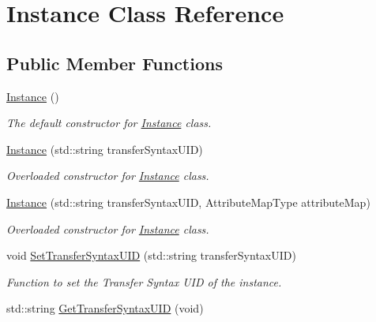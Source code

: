 \hypertarget{class_instance}{
\section{Instance Class Reference}
\label{class_instance}
}
\subsection*{Public Member Functions}
\begin{DoxyCompactItemize}
\item 
\hypertarget{class_instance_a399506c7e75ab9ab78fbc34a25932bbd}{
\hyperlink{class_instance_a399506c7e75ab9ab78fbc34a25932bbd}{Instance} ()}
\label{class_instance_a399506c7e75ab9ab78fbc34a25932bbd}

\begin{DoxyCompactList}\small\item\em The default constructor for \hyperlink{class_instance}{Instance} class. \item\end{DoxyCompactList}\item 
\hyperlink{class_instance_ada89b585181d0798259a37dbcd817147}{Instance} (std::string transferSyntaxUID)
\begin{DoxyCompactList}\small\item\em Overloaded constructor for \hyperlink{class_instance}{Instance} class. \item\end{DoxyCompactList}\item 
\hyperlink{class_instance_ac4d05edff24e60813e93b52e82148678}{Instance} (std::string transferSyntaxUID, AttributeMapType attributeMap)
\begin{DoxyCompactList}\small\item\em Overloaded constructor for \hyperlink{class_instance}{Instance} class. \item\end{DoxyCompactList}\item 
void \hyperlink{class_instance_a79ca7221b9c9277194b5af3c6f15b5ea}{SetTransferSyntaxUID} (std::string transferSyntaxUID)
\begin{DoxyCompactList}\small\item\em Function to set the Transfer Syntax UID of the instance. \item\end{DoxyCompactList}\item 
std::string \hyperlink{class_instance_ad46f30e59b49c6fe7cceca3460af21cf}{GetTransferSyntaxUID} (void)

\end{DoxyCompactItemize}
